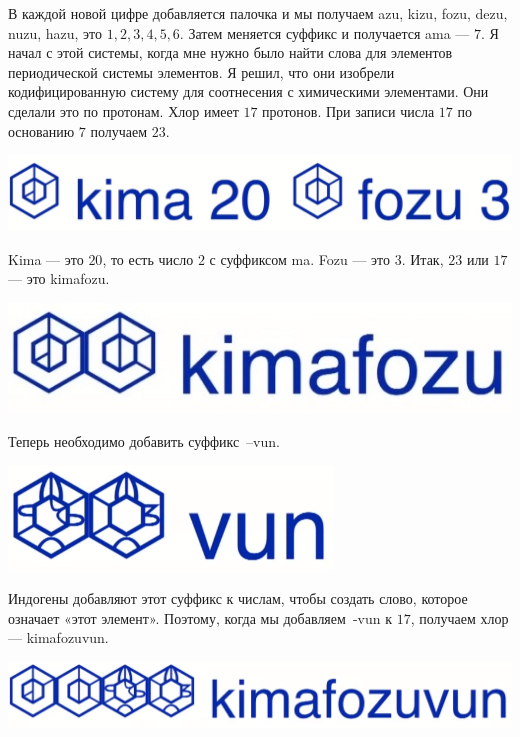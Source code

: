    В каждой новой цифре добавляется палочка и мы получаем azu, kizu, fozu, dezu, nuzu, hazu, это $1, 2, 3, 4, 5, 6$. Затем меняется суффикс и получается ama — $7$. Я начал с этой системы, когда мне нужно было найти слова для элементов периодической системы элементов. Я решил, что они изобрели кодифицированную систему для соотнесения с химическими элементами. Они сделали это по протонам. Хлор имеет $17$ протонов. При записи числа $17$ по основанию $7$ получаем $23$.
    
    \begin{center}
    \includegraphics[scale=0.1]{lingua/image3-19.jpeg}
    \end{center}
    
    Kima — это $20$, то есть число $2$ с суффиксом ma. Fozu — это $3$. Итак, $23$ или $17$ — это kimafozu.
    
    \begin{center}
    \includegraphics[scale=0.2]{lingua/image4-21.jpeg}
    \end{center}
    
    Теперь необходимо добавить суффикс~–vun.
    
    \begin{center}
    \includegraphics[scale=0.6]{lingua/image5-23.png}
    \end{center}
    
    Индогены добавляют этот суффикс к числам, чтобы создать слово, которое означает «этот элемент». Поэтому, когда мы добавляем~-vun к $17$, получаем хлор — kimafozuvun. 
    
    \begin{center}
    \includegraphics[scale=0.1]{lingua/image6-25.png}
    \end{center}
    
